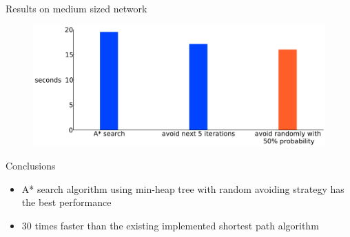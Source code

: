 \documentclass[final]{beamer}
\begin{document}
\begin{frame}{ }
\begin{columns}[t]
\begin{column}{.26\linewidth}
\begin{block}{Results on medium sized network}
\begin{figure}
                \includegraphics[width=\linewidth]{img/random_runtime}
            \end{figure}
        \end{block}
        \begin{block}{Conclusions}
            \begin{itemize}
                \itemsep.4em
                \item A* search algorithm using min-heap tree with random avoiding strategy has the \alert{best performance}
                \item \alert{30 times faster} than the existing implemented shortest path algorithm
            \end{itemize}
        \end{block}
    \end{column}
\end{columns}
\end{frame}
\end{document}
